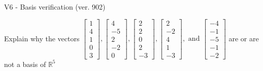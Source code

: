 \begin{exercise}
  \begin{exerciseTitle}V6 - Basis verification (ver. 902)\end{exerciseTitle}
  \begin{exerciseStatement}
    Explain why the vectors \(\left[\begin{array}{r}
1 \\
4 \\
1 \\
0 \\
3
\end{array}\right] , \left[\begin{array}{r}
4 \\
-5 \\
2 \\
-2 \\
0
\end{array}\right] , \left[\begin{array}{r}
2 \\
2 \\
0 \\
2 \\
-3
\end{array}\right] , \left[\begin{array}{r}
2 \\
-2 \\
4 \\
1 \\
-3
\end{array}\right] , \text{ and } \left[\begin{array}{r}
-4 \\
-1 \\
-5 \\
-1 \\
-2
\end{array}\right]\) are or are not a basis of \(\mathbb{R}^5\)	



\end{exerciseStatement}
\end{exercise}
